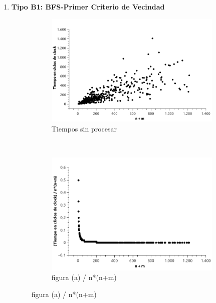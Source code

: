 \begin{enumerate}
\item \textbf{Tipo B1: BFS-Primer Criterio de Vecindad}

\begin{figure}[H]
        \centering
        \begin{subfigure}[b]{0.5\textwidth}
                \includegraphics[width=\textwidth]{imagenes/ejer4-grafB1-1.jpg}
                \caption{Tiempos sin procesar}
        \end{subfigure}%
        ~ %
        \begin{subfigure}[b]{0.5\textwidth}
                \includegraphics[width=\textwidth]{imagenes/ejer4-grafB1-2.jpg}
                \caption{figura (a) / n*(n+m)}
        \end{subfigure}


\end{figure}
\end{enumerate}
